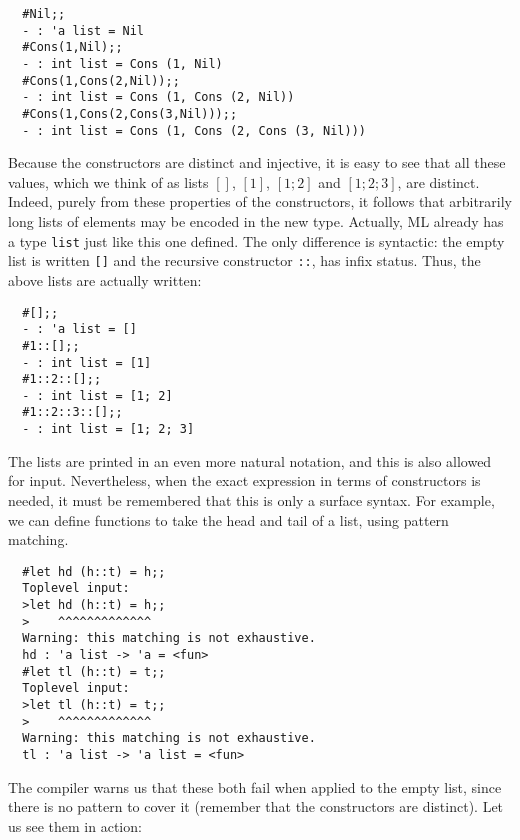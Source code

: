 \begin{boxed}\begin{verbatim}
  #Nil;;
  - : 'a list = Nil
  #Cons(1,Nil);;
  - : int list = Cons (1, Nil)
  #Cons(1,Cons(2,Nil));;
  - : int list = Cons (1, Cons (2, Nil))
  #Cons(1,Cons(2,Cons(3,Nil)));;
  - : int list = Cons (1, Cons (2, Cons (3, Nil)))
\end{verbatim}\end{boxed}

Because the constructors are distinct and injective, it is easy to see that all
these values, which we think of as lists $[]$, $[1]$, $[1;2]$ and $[1;2;3]$,
are distinct. Indeed, purely from these properties of the constructors, it
follows that arbitrarily long lists of elements may be encoded in the new type.
Actually, ML already has a type {\tt list} just like this one defined. The only
difference is syntactic: the empty list is written {\verb+[]+} and the
recursive constructor {\verb+::+}, has infix status. Thus, the above lists are
actually written:

\begin{boxed}\begin{verbatim}
  #[];;
  - : 'a list = []
  #1::[];;
  - : int list = [1]
  #1::2::[];;
  - : int list = [1; 2]
  #1::2::3::[];;
  - : int list = [1; 2; 3]
\end{verbatim}\end{boxed}

The lists are printed in an even more natural notation, and this is also
allowed for input. Nevertheless, when the exact expression in terms of
constructors is needed, it must be remembered that this is only a surface
syntax. For example, we can define functions to take the head and tail of a
list, using pattern matching.

\begin{boxed}\begin{verbatim}
  #let hd (h::t) = h;;
  Toplevel input:
  >let hd (h::t) = h;;
  >    ^^^^^^^^^^^^^
  Warning: this matching is not exhaustive.
  hd : 'a list -> 'a = <fun>
  #let tl (h::t) = t;;
  Toplevel input:
  >let tl (h::t) = t;;
  >    ^^^^^^^^^^^^^
  Warning: this matching is not exhaustive.
  tl : 'a list -> 'a list = <fun>
\end{verbatim}\end{boxed}

The compiler warns us that these both fail when applied to the empty list,
since there is no pattern to cover it (remember that the constructors are
distinct). Let us see them in action:

